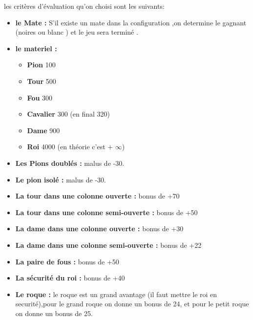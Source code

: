 \documentclass[12pt]{report}
\begin{document}
 les critères d'évaluation qu'on choisi sont les suivants:
 \begin{itemize}
 	\item \textbf{le Mate :}
 	\newline S'il existe un mate dans la configuration ,on determine le gagnant (noires ou blanc ) et le jeu sera terminé .
 	\item \textbf{le materiel :} 
 	\newline
 	\begin{itemize}
 		\item \textbf{ Pion }	 100 \\
 \item \textbf{	Tour }    500 \\
 \item \textbf{	Fou   }   300 \\
 \item \textbf{	Cavalier} 300 (en final 320) \\
 \item \textbf{	Dame	 }900 \\
 \item \textbf{	Roi		 }4000 (en théorie c'est + $\infty$) \\
 \end{itemize} 
	\item \textbf{Les Pions doublés :} malus de -30.\\
	\item \textbf{Le pion isolé :}     malus de -30.\\
	\item \textbf{La tour dans une colonne ouverte :} bonus de +70\\
	\item \textbf{La tour dans une colonne semi-ouverte :} bonus de +50\\	
	\item \textbf{La dame dans une colonne ouverte :} bonus de +30\\
	\item \textbf{La dame dans une colonne semi-ouverte :} bonus de +22\\	
	\item \textbf{La paire de fous :} bonus de +50\\	
	\item \textbf{La sécurité du roi :} bonus de +40\\	
	\item \textbf{Le roque :} le roque est un grand avantage (il faut mettre le roi en securité),pour le grand roque on donne un bonus de 24, et pour le petit roque on donne un bonus de 25. \\	

\end{itemize}
\end{document}
